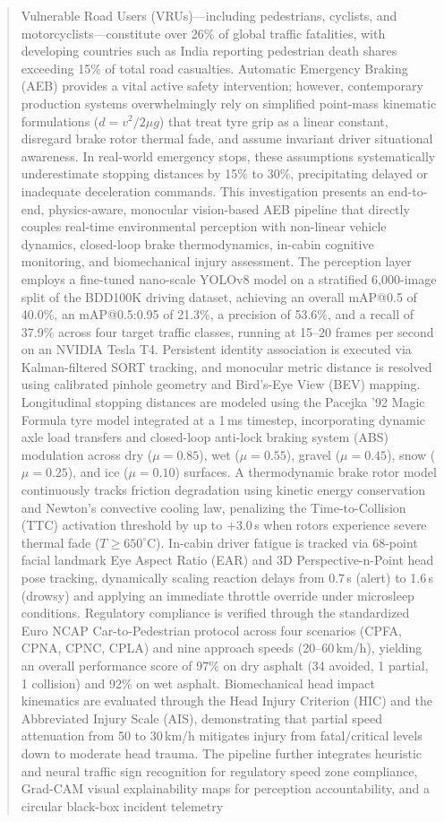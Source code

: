 \documentclass[3p,twocolumn]{elsarticle}
\begin{document}
\begin{frontmatter}
\begin{abstract}
Vulnerable Road Users (VRUs)---including pedestrians, cyclists, and motorcyclists---constitute over 26\% of global traffic fatalities, with developing countries such as India reporting pedestrian death shares exceeding 15\% of total road casualties. Automatic Emergency Braking (AEB) provides a vital active safety intervention; however, contemporary production systems overwhelmingly rely on simplified point-mass kinematic formulations ($d = v^2 / 2\mu g$) that treat tyre grip as a linear constant, disregard brake rotor thermal fade, and assume invariant driver situational awareness. In real-world emergency stops, these assumptions systematically underestimate stopping distances by 15\% to 30\%, precipitating delayed or inadequate deceleration commands. This investigation presents an end-to-end, physics-aware, monocular vision-based AEB pipeline that directly couples real-time environmental perception with non-linear vehicle dynamics, closed-loop brake thermodynamics, in-cabin cognitive monitoring, and biomechanical injury assessment. The perception layer employs a fine-tuned nano-scale YOLOv8 model on a stratified 6,000-image split of the BDD100K driving dataset, achieving an overall mAP@0.5 of 40.0\%, an mAP@0.5:0.95 of 21.3\%, a precision of 53.6\%, and a recall of 37.9\% across four target traffic classes, running at 15--20 frames per second on an NVIDIA Tesla T4. Persistent identity association is executed via Kalman-filtered SORT tracking, and monocular metric distance is resolved using calibrated pinhole geometry and Bird's-Eye View (BEV) mapping. Longitudinal stopping distances are modeled using the Pacejka '92 Magic Formula tyre model integrated at a 1\,ms timestep, incorporating dynamic axle load transfers and closed-loop anti-lock braking system (ABS) modulation across dry ($\mu=0.85$), wet ($\mu=0.55$), gravel ($\mu=0.45$), snow ($\mu=0.25$), and ice ($\mu=0.10$) surfaces. A thermodynamic brake rotor model continuously tracks friction degradation using kinetic energy conservation and Newton's convective cooling law, penalizing the Time-to-Collision (TTC) activation threshold by up to $+3.0$\,s when rotors experience severe thermal fade ($T \ge 650^\circ$C). In-cabin driver fatigue is tracked via 68-point facial landmark Eye Aspect Ratio (EAR) and 3D Perspective-n-Point head pose tracking, dynamically scaling reaction delays from 0.7\,s (alert) to 1.6\,s (drowsy) and applying an immediate throttle override under microsleep conditions. Regulatory compliance is verified through the standardized Euro NCAP Car-to-Pedestrian protocol across four scenarios (CPFA, CPNA, CPNC, CPLA) and nine approach speeds (20--60\,km/h), yielding an overall performance score of 97\% on dry asphalt (34 avoided, 1 partial, 1 collision) and 92\% on wet asphalt. Biomechanical head impact kinematics are evaluated through the Head Injury Criterion (HIC) and the Abbreviated Injury Scale (AIS), demonstrating that partial speed attenuation from 50 to 30\,km/h mitigates injury from fatal/critical levels down to moderate head trauma. The pipeline further integrates heuristic and neural traffic sign recognition for regulatory speed zone compliance, Grad-CAM visual explainability maps for perception accountability, and a circular black-box incident telemetry 
\end{abstract}
\end{frontmatter}
\end{document}
